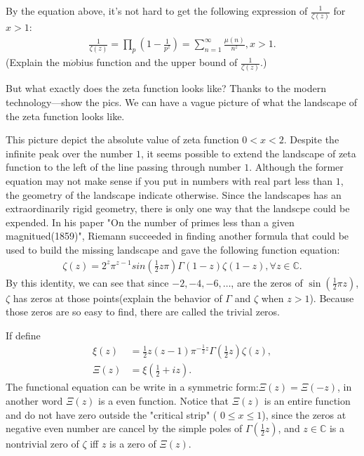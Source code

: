 \documentclass[11pt]{amsart}
\newcommand{\C}{\mathbb C }
\begin{document}
By the equation above, it's not hard to get the following expression of  $\frac{1}{\zeta(z)}$ for $x > 1$:
\begin{align*}
\frac{1}{\zeta(z)} = \prod_{p} (1 - \frac{1}{p^z})  
                                  = \sum^{\infty}_{n=1} \frac{\mu(n)}{n^z},  x > 1.
\end{align*}
(Explain the m$\ddot{o}$bius function and the upper bound of $\frac{1}{\zeta(z)}$.)

But what exactly does the zeta function looks like? Thanks  to the modern technology---show the pics. We 
can have a vague picture of what the landscape of the zeta function looks like.

This picture depict the absolute value of zeta function $0 < x <  2$.
Despite the infinite peak over the number $1$,  it seems possible to extend the landscape of zeta function 
to the left of the line passing through number $1$. Although the former equation may not make sense if you 
put in numbers with real part less than $1$, the geometry of the landscape indicate otherwise.
Since the landscapes has an extraordinarily rigid geometry, there is only one way that the landscpe could be 
expended. In his paper "On the number of primes less than a given magnitued(1859)", Riemann succeeded in finding 
another formula that could be used to build the missing landscape and gave the following function equation:
\begin{align*}
\zeta(z) = 2^{z}\pi^{z-1}sin(\frac{1}{2}z\pi)\Gamma(1-z)\zeta(1-z),  \forall z \in \C.
\end{align*}
By this identity, we can see that since $-2, -4, -6, \ldots$, are the zeros of $\sin(\frac{1}{2}\pi z)$, $\zeta$ has 
zeros at those points(explain the behavior of $\Gamma$ and $\zeta$ when $z > 1$). Because those zeros 
are so easy to find, there are called the trivial zeros.

If define 
\begin{align*}
\xi(z) &= \frac{1}{2}z(z-1)\pi^{-\frac{1}{2}z}\Gamma(\frac{1}{2}z)\zeta(z), \\
\Xi(z) &= \xi(\frac{1}{2} + iz).
\end{align*}
The functional equation can be write in a symmetric form:$\Xi(z) = \Xi(-z)$, in another word $\Xi(z)$ is a even
function. Notice that $\Xi(z)$ is an entire function and do not have zero outside the "critical strip" ( $ 0 \leq x \leq 1$), since the zeros at 
negative even number are cancel by the simple poles of $\Gamma (\frac{1}{2}z)$, and $z \in \C $ is a 
nontrivial zero of $\zeta$ iff $z$ is a zero of $\Xi(z)$.
\end{document}
